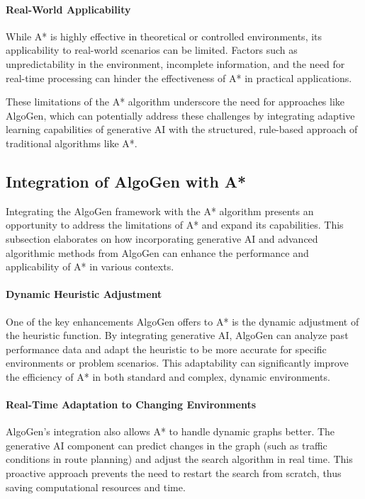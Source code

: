 \documentclass{article}
\begin{document}
\paragraph{Real-World Applicability}
While A* is highly effective in theoretical or controlled environments, its applicability to real-world scenarios can be limited. Factors such as unpredictability in the environment, incomplete information, and the need for real-time processing can hinder the effectiveness of A* in practical applications.

These limitations of the A* algorithm underscore the need for approaches like AlgoGen, which can potentially address these challenges by integrating adaptive learning capabilities of generative AI with the structured, rule-based approach of traditional algorithms like A*.


\subsection{Integration of AlgoGen with A*}

Integrating the AlgoGen framework with the A* algorithm presents an opportunity to address the limitations of A* and expand its capabilities. This subsection elaborates on how incorporating generative AI and advanced algorithmic methods from AlgoGen can enhance the performance and applicability of A* in various contexts.

\paragraph{Dynamic Heuristic Adjustment}
One of the key enhancements AlgoGen offers to A* is the dynamic adjustment of the heuristic function. By integrating generative AI, AlgoGen can analyze past performance data and adapt the heuristic to be more accurate for specific environments or problem scenarios. This adaptability can significantly improve the efficiency of A* in both standard and complex, dynamic environments.

\paragraph{Real-Time Adaptation to Changing Environments}
AlgoGen's integration also allows A* to handle dynamic graphs better. The generative AI component can predict changes in the graph (such as traffic conditions in route planning) and adjust the search algorithm in real time. This proactive approach prevents the need to restart the search from scratch, thus saving computational resources and time.
\end{document}
